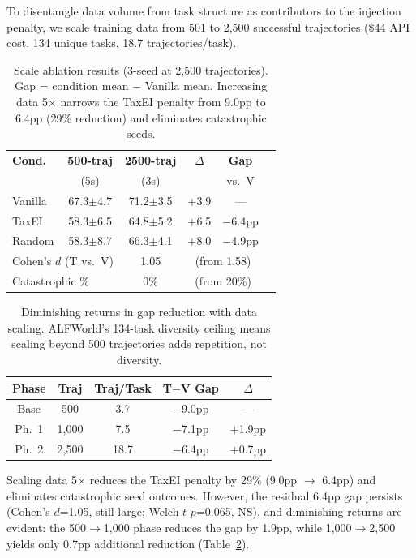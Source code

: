 \documentclass[11pt]{article}
\begin{document}
To disentangle data volume from task structure as contributors to the injection penalty, we scale training data from 501 to 2,500 successful trajectories (\$44 API cost, 134 unique tasks, 18.7 trajectories/task).

\begin{table}[t]
\centering
\small
\begin{tabular}{lccccc}
\toprule
\textbf{Cond.} & \textbf{500-traj} & \textbf{2500-traj} & \textbf{$\Delta$} & \textbf{Gap} \\
& (5s) & (3s) & & vs.\ V \\
\midrule
Vanilla & 67.3\scriptsize{$\pm$4.7} & 71.2\scriptsize{$\pm$3.5} & +3.9 & --- \\
TaxEI   & 58.3\scriptsize{$\pm$6.5} & 64.8\scriptsize{$\pm$5.2} & +6.5 & $-$6.4pp \\
Random  & 58.3\scriptsize{$\pm$8.7} & 66.3\scriptsize{$\pm$4.1} & +8.0 & $-$4.9pp \\
\midrule
\multicolumn{2}{l}{Cohen's $d$ (T vs.\ V)} & \multicolumn{1}{c}{1.05} & \multicolumn{2}{c}{(from 1.58)} \\
\multicolumn{2}{l}{Catastrophic \%} & \multicolumn{1}{c}{0\%} & \multicolumn{2}{c}{(from 20\%)} \\
\bottomrule
\end{tabular}
\caption{Scale ablation results (3-seed at 2,500 trajectories). Gap = condition mean $-$ Vanilla mean. Increasing data 5$\times$ narrows the TaxEI penalty from 9.0pp to 6.4pp (29\% reduction) and eliminates catastrophic seeds.}
\label{tab:scale}
\end{table}

\begin{table}[t]
\centering
\small
\begin{tabular}{ccccc}
\toprule
\textbf{Phase} & \textbf{Traj} & \textbf{Traj/Task} & \textbf{T$-$V Gap} & \textbf{$\Delta$} \\
\midrule
Base & 500 & 3.7 & $-$9.0pp & --- \\
Ph.\ 1 & 1,000 & 7.5 & $-$7.1pp & +1.9pp \\
Ph.\ 2 & 2,500 & 18.7 & $-$6.4pp & +0.7pp \\
\bottomrule
\end{tabular}
\caption{Diminishing returns in gap reduction with data scaling. ALFWorld's 134-task diversity ceiling means scaling beyond 500 trajectories adds repetition, not diversity.}
\label{tab:diminishing}
\end{table}

Scaling data 5$\times$ reduces the TaxEI penalty by 29\% (9.0pp $\to$ 6.4pp) and eliminates catastrophic seed outcomes.
However, the residual 6.4pp gap persists (Cohen's $d$=1.05, still large; Welch $t$ $p$=0.065, NS), and diminishing returns are evident: the 500$\to$1,000 phase reduces the gap by 1.9pp, while 1,000$\to$2,500 yields only 0.7pp additional reduction (Table~\ref{tab:diminishing}).
\end{document}
